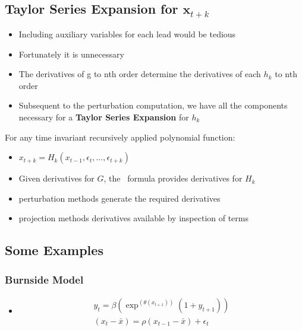 \documentclass[12pt]{article}
\begin{document}
\subsection{Taylor Series Expansion for ${\mathbf x_{t+k}}$}

  \begin{itemize}
  \item Including auxiliary variables for each lead would be tedious
  \item Fortunately it is unnecessary
\item   The derivatives of g to nth order determine the derivatives of each
$h_k$ to nth order
\item Subsequent to the perturbation computation, we have all the components necessary for a {\bf Taylor Series Expansion} for $h_k$
  \end{itemize}


For any time invariant recursively applied polynomial function:
\begin{itemize}
\item $x_{t+k}=H_k(x_{t-1},\epsilon_t, \ldots,\epsilon_{t+k})$
\item Given derivatives for $G$, the \faa\ formula provides derivatives for $H_k$
\item perturbation methods generate the required derivatives
\item projection methods derivatives available by inspection of terms
\end{itemize}


\subsection{Some Examples}
\label{sec:some-examples}


\subsubsection{Burnside Model}
\label{sec:burnside-model}

  

  \begin{itemize}
  \item \cite{burnside}
    \begin{gather*}
y_t=\beta(\exp^{(\theta(x_{t+1}))} (1+y_{t+1}))\\
(x_t-\bar{x}) = \rho (x_{t-1}-\bar{x})   + \epsilon_t 
    \end{gather*}
  \end{itemize}
\end{document}
